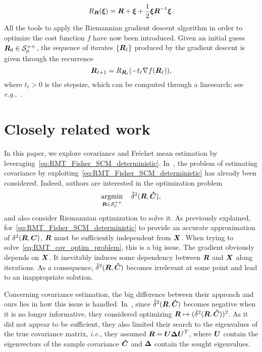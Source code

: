 \documentclass{article}
\theoremstyle{plain}
\theoremstyle{definition}
\theoremstyle{remark}
\begin{document}
\begin{equation}
    R_{\boldsymbol{R}}(\boldsymbol{\xi}) = \boldsymbol{R} + \boldsymbol{\xi} + \frac12\boldsymbol{\xi}\boldsymbol{R}^{-1}\boldsymbol{\xi}.
\label{eq:retr}
\end{equation}
%
All the tools to apply the Riemannian gradient descent algorithm in order to optimize the cost function $f$ have now been introduced.
Given an initial guess $\boldsymbol{R}_0\in\mathcal{S}^{++}_{p}$, the sequence of iterates $\{\boldsymbol{R}_{\ell}\}$ produced by the gradient descent is given through the recurrence
\begin{equation}
    \boldsymbol{R}_{\ell+1} = R_{\boldsymbol{R}_\ell}(-t_\ell\nabla f(\boldsymbol{R}_\ell)),
\label{eq:RgradDescent}
\end{equation}
where $t_\ell>0$ is the stepsize, which can be computed through a linesearch; see \emph{e.g.},~\cite{absil2009optimization}.




\section{Closely related work}

In this paper, we explore covariance and Fréchet mean estimation by leveraging~\eqref{eq:RMT_Fisher_SCM_deterministic}.
In~\cite{tiomoko2019random}, the problem of estimating covariance by exploiting~\eqref{eq:RMT_Fisher_SCM_deterministic} has already been considered.
Indeed, authors are interested in the optimization problem
\begin{equation}
    \operatorname*{argmin}_{\boldsymbol{R}\in\mathcal{S}^{++}_{p}} \quad \hat{\delta}^2(\boldsymbol{R},\boldsymbol{\hat{C}}),
\label{eq:RMT_cov_optim_problem}
\end{equation}
and also consider Riemannian optimization to solve it.
As previously explained, for~\eqref{eq:RMT_Fisher_SCM_deterministic} to provide an accurate approximation of $\delta^2(\boldsymbol{R},\boldsymbol{C})$, $\boldsymbol{R}$ must be sufficiently independent from $\boldsymbol{X}$.
%
When trying to solve~\eqref{eq:RMT_cov_optim_problem}, this is a big issue.
The gradient obviously depends on $\boldsymbol{X}$.
It inevitably induces some dependency between $\boldsymbol{R}$ and $\boldsymbol{X}$ along iterations.
As a consequence, $\hat{\delta}^2(\boldsymbol{R},\boldsymbol{\hat{C}})$ becomes irrelevant  at some point and lead to an inappropriate solution.

Concerning covariance estimation, the big difference between their approach and ours lies in how this issue is handled.
In~\cite{tiomoko2019random}, since $\hat{\delta}^2(\boldsymbol{R},\boldsymbol{\hat{C}})$ becomes negative when it is no longer informative, they considered optimizing $\boldsymbol{R}\mapsto(\hat{\delta}^2(\boldsymbol{R},\boldsymbol{\hat{C}}))^2$.
As it did not appear to be sufficient, they also limited their search to the eigenvalues of the true covariance matrix, \emph{i.e.}, they assumed $\boldsymbol{R}=\boldsymbol{U}\boldsymbol{\Delta}\boldsymbol{U}^T$, where $\boldsymbol{U}$ contain the eigenvectors of the sample covariance $\boldsymbol{\hat{C}}$ and $\boldsymbol{\Delta}$ contain the sought eigenvalues.
\end{document}
